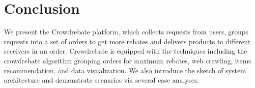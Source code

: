 \section{Conclusion}
\label{sec:conclusion}

We present the Crowdrebate platform, which collects requests from users, groups requests into a set of orders to get more rebates and delivers products to different receivers in an order. Crowdrebate is equipped with the techniques including the crowdrebate algorithm grouping orders for maximum rebates, web crawling, items recommendation, and data visualization. We also introduce the sketch of system architecture and demonstrate scenarios via several case analyses. 
 
